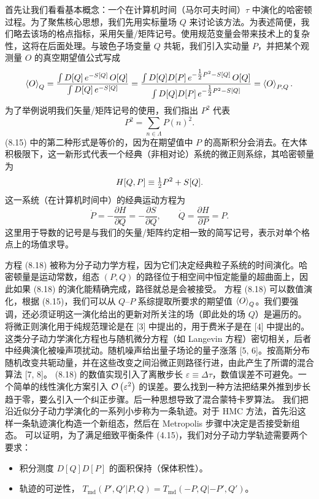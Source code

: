 首先让我们看看基本概念：一个在计算机时间（马尔可夫时间）$\tau$ 中演化的哈密顿过程。为了聚焦核心思想，我们先用实标量场 $Q$ 来讨论该方法。为表述简便，我们略去该场的格点指标，采用矢量/矩阵记号。使用规范变量会带来技术上的复杂性，这将在后面处理。与玻色子场变量 $Q$ 共轭，我们引入实动量 $P$，并把某个观测量 $O$ 的真空期望值公式写成
\begin{equation}
\left\langle O \right\rangle_Q = \frac{\int D[Q]\,e^{-S[Q]}\,O[Q]}{\int D[Q]\,e^{-S[Q]}}
= \frac{\int D[Q]D[P]\,e^{-\tfrac{1}{2} P^2 - S[Q]}\,O[Q]}
        {\int D[Q]D[P]\,e^{-\tfrac{1}{2} P^2 - S[Q]}}
= \left\langle O \right\rangle_{P,Q}.
\end{equation}
为了举例说明我们矢量/矩阵记号的使用，我们指出 $P^2$ 代表
\begin{equation}
P^2 = \sum_{n\in\Lambda}P(n)^2.
\end{equation}
(8.15) 中的第二种形式是等价的，因为在期望值中 $P$ 的高斯积分会消去。在大体积极限下，这一新形式代表一个经典（非相对论）系统的微正则系综，其哈密顿量为
\begin{equation}
H[Q,P] \equiv \tfrac{1}{2} P^2 + S[Q].
\end{equation}
这一系统（在计算机时间中）的经典运动方程为
\begin{equation}
\dot{P} = -\frac{\partial H}{\partial Q} = -\frac{\partial S}{\partial Q},
\qquad \dot{Q} = \frac{\partial H}{\partial P} = P.
\end{equation}
这里用于导数的记号是与我们的矢量/矩阵约定相一致的简写记号，表示对单个格点上的场值求导。

方程 (8.18) 被称为分子动力学方程，因为它们决定经典粒子系统的时间演化。哈密顿量是运动常数，组态 $(P,Q)$ 的路径位于相空间中恒定能量的超曲面上，因此如果 (8.18) 的演化能精确完成，路径就总是会被接受。
方程 (8.18) 可以数值演化，根据 (8.15)，我们可以从 $Q$--$P$ 系综提取所要求的期望值 $\left\langle O \right\rangle_Q$。我们要强调，还必须证明这一演化给出的更新对所关注的场（即此处的场 $Q$）是遍历的。
将微正则演化用于纯规范理论是在 [3] 中提出的，用于费米子是在 [4] 中提出的。这类分子动力学演化方程也与随机微分方程（如 Langevin 方程）密切相关，后者中经典演化被噪声项扰动。随机噪声给出量子场论的量子涨落 [5, 6]。按高斯分布随机改变共轭动量，并在这些改变之间沿微正则路径行进，由此产生了所谓的混合算法 [7, 8]。
(8.18) 的数值实现引入了离散步长 $\varepsilon \equiv \Delta\tau$，数值误差不可避免。一个简单的线性演化方案引入 $\mathcal{O}\left(\varepsilon^2\right)$ 的误差。要么找到一种方法把结果外推到步长趋于零，要么引入一个纠正步骤。后一种思想导致了混合蒙特卡罗算法。
我们把沿近似分子动力学演化的一系列小步称为一条轨迹。对于 HMC 方法，首先沿这样一条轨迹演化构造一个新组态，然后在 Metropolis 步骤中决定是否接受新组态。
可以证明，为了满足细致平衡条件 (4.15)，我们对分子动力学轨迹需要两个要求：
\begin{itemize}
  \item 积分测度 $D[Q]D[P]$ 的面积保持（保体积性）。
  \item 轨迹的可逆性，
        $T_{\mathrm{md}}(P',Q'|P,Q) = T_{\mathrm{md}}(-P,Q|-P',Q')$。
\end{itemize}


